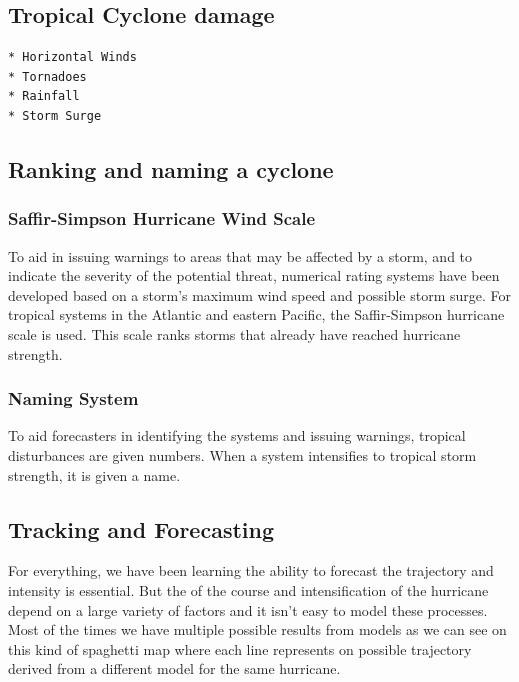 \documentclass[12pt,oneside]{book}
\begin{document}
\subsection{Tropical Cyclone damage}\label{tropical-cyclone-damage}

\begin{verbatim}
* Horizontal Winds
* Tornadoes
* Rainfall
* Storm Surge
\end{verbatim}

\subsection{Ranking and naming a
cyclone}\label{ranking-and-naming-a-cyclone}

\subsubsection{Saffir-Simpson Hurricane Wind
Scale}\label{saffir-simpson-hurricane-wind-scale}

To aid in issuing warnings to areas that may be affected by a storm, and
to indicate the severity of the potential threat, numerical rating
systems have been developed based on a storm's maximum wind speed and
possible storm surge. For tropical systems in the Atlantic and eastern
Pacific, the Saffir-Simpson hurricane scale is used. This scale ranks
storms that already have reached hurricane strength.

\subsubsection{Naming System}\label{naming-system}

To aid forecasters in identifying the systems and issuing warnings,
tropical disturbances are given numbers. When a system intensifies to
tropical storm strength, it is given a name.

\subsection{Tracking and Forecasting}\label{tracking-and-forecasting}

For everything, we have been learning the ability to forecast the
trajectory and intensity is essential. But the of the course and
intensification of the hurricane depend on a large variety of factors
and it isn't easy to model these processes. Most of the times we have
multiple possible results from models as we can see on this kind of
spaghetti map where each line represents on possible trajectory derived
from a different model for the same hurricane.
\end{document}
